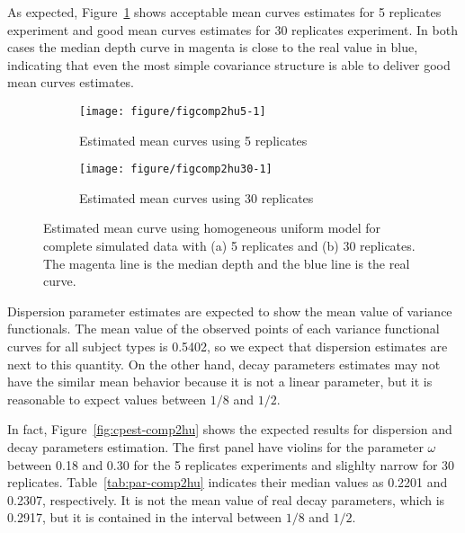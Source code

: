 As expected, Figure~\ref{fig:mpc-comp2hu} shows acceptable mean curves estimates for 5 replicates experiment and good mean curves estimates for 30 replicates experiment. In both cases the median depth curve in magenta is close to the real value in blue, indicating that even the most simple covariance structure is able to deliver good mean curves estimates.


\begin{figure}[t]
  \begin{subfigure}{\textwidth}
    \centering
\begin{knitrout}
\color{fgcolor}
\texttt{[image: figure/figcomp2hu5-1]} 

\end{knitrout}
    \caption{Estimated mean curves using 5 replicates}
  \end{subfigure}
    \begin{subfigure}{\textwidth}
      \centering
\begin{knitrout}
\color{fgcolor}
\texttt{[image: figure/figcomp2hu30-1]} 

\end{knitrout}
    \caption{Estimated mean curves using 30 replicates}
  \end{subfigure}
  \caption{Estimated mean curve using homogeneous uniform model for complete simulated data with (a) 5 replicates and (b) 30 replicates. The magenta line is the median depth and the blue line is the real curve.}
  \label{fig:mpc-comp2hu}
\end{figure}


Dispersion parameter estimates are expected to show the mean value of variance functionals. The mean value of the observed points of each variance functional curves for all subject types is 0.5402, so we expect that dispersion estimates are next to this quantity. On the other hand, decay parameters estimates may not have the similar mean behavior because it is not a linear parameter, but it is reasonable to expect values between $1/8$ and $1/2$.

In fact, Figure~\ref{fig:cpest-comp2hu} shows the expected results for dispersion and decay parameters estimation. The first panel have violins for the parameter $\omega$ between 0.18 and 0.30 for the 5 replicates experiments and slighlty narrow for 30 replicates. Table~\ref{tab:par-comp2hu} indicates their median values as 0.2201 and 0.2307, respectively. It is not the mean value of real decay parameters, which is 0.2917, but it is contained in the interval between $1/8$ and $1/2$.

